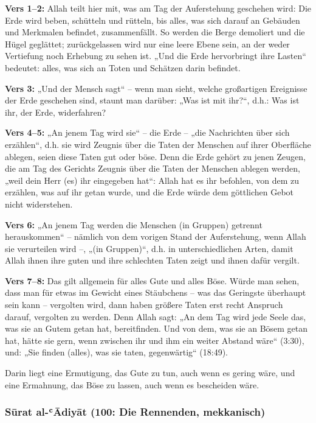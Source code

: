 \textbf{Vers 1–2:} Allah  teilt hier mit, was am Tag der Auferstehung geschehen wird: Die
Erde wird beben, schütteln und rütteln, bis alles, was sich darauf an Gebäuden und Merkmalen
befindet, zusammenfällt. So werden die Berge demoliert und die Hügel geglättet; zurückgelassen
wird nur eine leere Ebene sein, an der weder Vertiefung noch Erhebung zu sehen ist. „Und die
Erde hervorbringt ihre Lasten“ bedeutet: alles, was sich an Toten und Schätzen darin befindet.

\textbf{Vers 3:} „Und der Mensch sagt“ – wenn man sieht, welche großartigen Ereignisse der Erde
geschehen sind, staunt man darüber: „Was ist mit ihr?“, d.h.: Was ist ihr, der Erde, widerfahren?

\textbf{Vers 4–5:} „An jenem Tag wird sie“ – die Erde – „die Nachrichten über sich erzählen“, d.h.
sie wird Zeugnis über die Taten der Menschen auf ihrer Oberfläche ablegen, seien diese Taten
gut oder böse. Denn die Erde gehört zu jenen Zeugen, die am Tag des Gerichts Zeugnis über die
Taten der Menschen ablegen werden, „weil dein Herr (es) ihr eingegeben hat“: Allah hat es ihr
befohlen, von dem zu erzählen, was auf ihr getan wurde, und die Erde würde dem göttlichen
Gebot nicht widerstehen.

\textbf{Vers 6:} „An jenem Tag werden die Menschen (in Gruppen) getrennt herauskommen“ –
nämlich von dem vorigen Stand der Auferstehung, wenn Allah sie verurteilen wird –, „(in
Gruppen)“, d.h. in unterschiedlichen Arten, damit Allah ihnen ihre guten und ihre schlechten
Taten zeigt und ihnen dafür vergilt.

\textbf{Vers 7–8:} Das gilt allgemein für alles Gute und alles Böse. Würde man sehen, dass man
für etwas im Gewicht eines Stäubchens – was das Geringste überhaupt sein kann – vergolten
wird, dann haben größere Taten erst recht Anspruch darauf, vergolten zu werden. Denn Allah
 sagt: „An dem Tag wird jede Seele das, was sie an Gutem getan hat, bereitfinden. Und von
dem, was sie an Bösem getan hat, hätte sie gern, wenn zwischen ihr und ihm ein weiter Abstand
wäre“ (3:30), und: „Sie finden (alles), was sie taten, gegenwärtig“ (18:49).

\begin{merke}
Darin liegt eine Ermutigung, das Gute zu tun, auch wenn es gering wäre, und eine Ermahnung,
das Böse zu lassen, auch wenn es bescheiden wäre.
\end{merke}

\subsubsection*{Sūrat al-ʿĀdiyāt (100: Die Rennenden, mekkanisch)}

